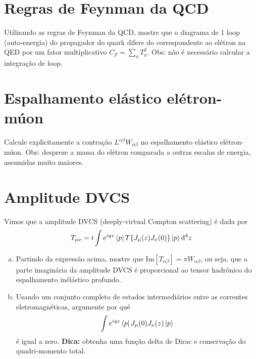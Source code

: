 \documentclass[a4paper, 11pt, oneside]{impression}
\begin{document}


\chapter{Regras de Feynman da QCD}\label{quest: five}

\begin{exercise}{}
    Utilizando as regras de Feynman da QCD, mostre que o diagrama de 1 loop (auto-energia) do propagador do quark difere do correspondente ao elétron na QED por um fator multiplicativo $C_{F} = \displaystyle\sum_{a}T_{a}^{2}$. Obs: não é necessário calcular a integração de loop.
\end{exercise}



\chapter{Espalhamento elástico elétron-múon}\label{quest: six}

\begin{exercise}{}
    Calcule explicitamente a contração $L^{\alpha\beta}W_{\alpha\beta}$ no espalhamento elástico elétron-múon. Obs: despreze a massa do elétron comparada a outras escalas de energia, assumidas muito maiores.
\end{exercise}



\chapter{Amplitude DVCS}\label{quest: seven}

\begin{exercise}{}
    Vimos que a amplitude DVCS (deeply-virtual Compton scattering) é dada por
        \begin{equation*}
            T_{\mu\nu} = i\int e^{iqz}\bra{p}T\{J_{\mu}(z)J_{\nu}(0)\}\ket{p}\dd[4]{z}
        \end{equation*}
    \begin{enumerate}[(a)]
        \item Partindo da expressão acima, mostre que $\text{Im}[T_{\alpha\beta}] = \pi W_{\alpha\beta}$, ou seja, que a parte imaginária da amplitude DVCS é proporcional ao tensor hadrônico do espalhamento inélástico profundo.
        \item Usando um conjunto completo de estados intermediários entre as correntes eletromagnéticas, argumente por quê
            \begin{equation*}
                \int e^{iqz} \bra{p}J_{\mu}(0)J_{\nu}(z)\ket{p}
            \end{equation*}
        é igual a zero. \textbf{Dica:} obtenha uma função delta de Dirac e conservação do quadri-momento total.
    \end{enumerate}
\end{exercise}
\end{document}
